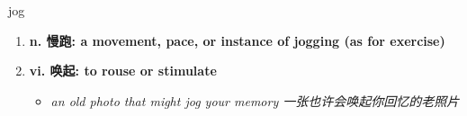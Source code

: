 
\begin{frame}
{\huge jog}
\begin{center}
\begin{enumerate}\Large
  \item \textbf{n. 慢跑: a movement, pace, or instance of jogging (as for exercise)}
  \item \textbf{vi. 唤起: to rouse or stimulate}
  \begin{itemize}
    \item \em{\Large{an old photo that might jog your memory 一张也许会唤起你回忆的老照片}}
  \end{itemize}
\end{enumerate}
\end{center}
\end{frame}
